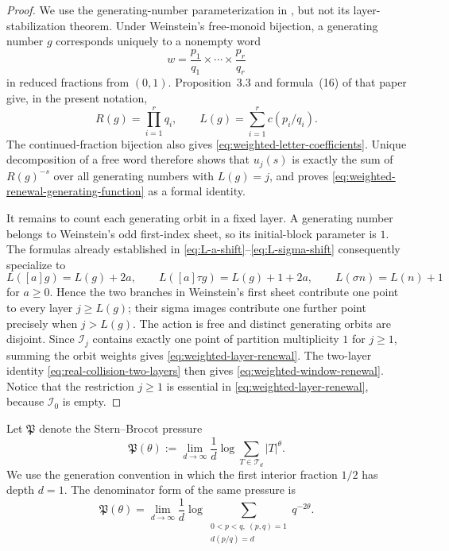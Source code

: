 \begin{proof}
We use the generating-number parameterization in
\cite[Secs.~3--4]{Weinstein2016}, but not its layer-stabilization theorem.
Under Weinstein's free-monoid bijection, a generating number \(g\) corresponds
uniquely to a nonempty word
\[
 w=\frac{p_1}{q_1}\times\cdots\times\frac{p_r}{q_r}
\]
in reduced fractions from \((0,1)\).  Proposition~3.3 and formula~(16) of
that paper give, in the present notation,
\begin{equation}
 R(g)=\prod_{i=1}^r q_i,
 \qquad L(g)=\sum_{i=1}^r c(p_i/q_i).
 \label{eq:generator-weight-length}
\end{equation}
The continued-fraction bijection also gives
\eqref{eq:weighted-letter-coefficients}.  Unique decomposition of a free word
therefore shows that \(u_j(s)\) is exactly the sum of \(R(g)^{-s}\) over all
generating numbers with \(L(g)=j\), and proves
\eqref{eq:weighted-renewal-generating-function} as a formal identity.

It remains to count each generating orbit in a fixed layer.  A generating
number belongs to Weinstein's odd first-index sheet, so its initial-block
parameter is \(1\).  The formulas already established in
\eqref{eq:L-a-shift}--\eqref{eq:L-sigma-shift} consequently specialize to
\[
 L([a]g)=L(g)+2a,\qquad
 L([a]\tau g)=L(g)+1+2a,\qquad
 L(\sigma n)=L(n)+1
\]
for \(a\ge0\).  Hence the two branches in Weinstein's first sheet contribute
one point to every layer \(j\ge L(g)\); their sigma images contribute one
further point precisely when \(j>L(g)\).  The action is free and distinct
generating orbits are disjoint.  Since \(\mathcal I_j\) contains exactly one
point of partition multiplicity \(1\) for \(j\ge1\), summing the orbit weights
gives \eqref{eq:weighted-layer-renewal}.  The two-layer identity
\eqref{eq:real-collision-two-layers} then gives
\eqref{eq:weighted-window-renewal}.  Notice that the restriction \(j\ge1\) is
essential in \eqref{eq:weighted-layer-renewal}, because \(\mathcal I_0\) is
empty.
\end{proof}

Let \(\mathfrak P\) denote the Stern--Brocot pressure
\[
 \mathfrak P(\theta)
 :=\lim_{d\to\infty}\frac1d
   \log\sum_{T\in\mathcal T_d}|T|^\theta .
\]
We use the generation convention in which the first interior fraction
\(1/2\) has depth \(d=1\).  The denominator form of the same pressure
\cite[Sec.~2 and Thm.~1.1]{KessebohmerStratmann2007} is
\begin{equation}
 \mathfrak P(\theta)=
 \lim_{d\to\infty}\frac1d\log
 \sum_{\substack{0<p<q,\ (p,q)=1\\d(p/q)=d}}q^{-2\theta}.
 \label{eq:stern-brocot-denominator-convention}
\end{equation}

